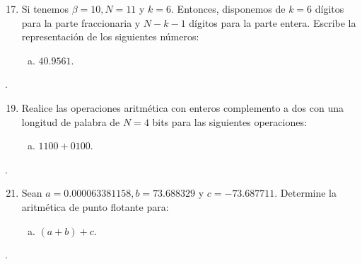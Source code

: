 \begin{frame}
	\begin{enumerate}\setcounter{enumi}{16}
		\item

		      Si tenemos $\beta=10, N=11$ y $k=6$.
		      Entonces, disponemos de $k=6$ dígitos para la parte
		      fraccionaria y $N-k-1$ dígitos para la parte entera.
		      Escribe la representación de los siguientes números:

		      \begin{enumerate}[b)]
			      \item

			            $40.9561$.
		      \end{enumerate}
	\end{enumerate}

	\begin{solution}
		.
	\end{solution}
\end{frame}

\begin{frame}
	\begin{enumerate}\setcounter{enumi}{18}
		\item

		      Realice las operaciones aritmética con enteros complemento
		      a dos con una longitud de palabra de $N=4$ bits para las
		      siguientes operaciones:

		      \begin{enumerate}[b)]
			      \item

			            $1100+0100$.
		      \end{enumerate}
	\end{enumerate}

	\begin{solution}
		.
	\end{solution}
\end{frame}

\begin{frame}
	\begin{enumerate}\setcounter{enumi}{20}
		\item

		      Sean $a=0.000063381158, b=73.688329$ y $c=-73.687711$.
		      Determine la aritmética de punto flotante para:

		      \begin{enumerate}[b)]
			      \item

			            $\left(a+b\right)+c$.
		      \end{enumerate}
	\end{enumerate}

	\begin{solution}
		.
	\end{solution}
\end{frame}




